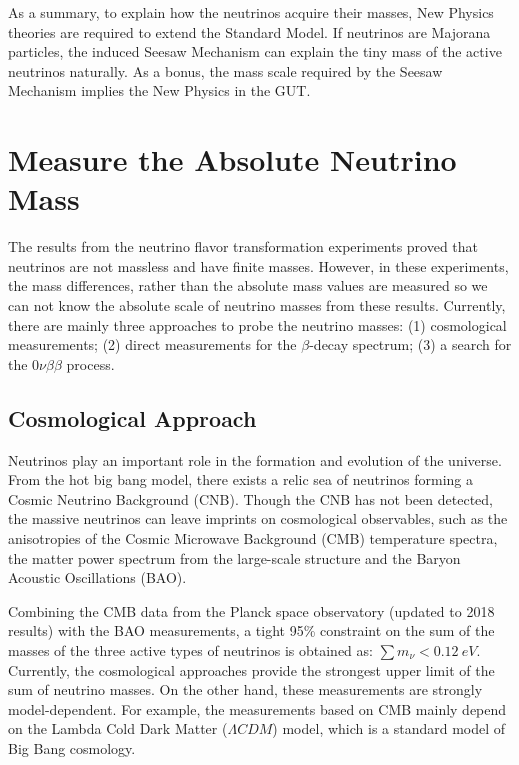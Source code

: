 As a summary, to explain how the neutrinos acquire their masses, New Physics theories are required to extend the Standard Model. If neutrinos are Majorana particles, the induced Seesaw Mechanism can explain the tiny mass of the active neutrinos naturally. As a bonus, the mass scale required by the Seesaw Mechanism implies the New Physics in the GUT.

\section{Measure the Absolute Neutrino Mass}

The results from the neutrino flavor transformation experiments proved that neutrinos are not massless and have finite masses. However, in these experiments, the mass differences, rather than the absolute mass values are measured so we can not know the absolute scale of neutrino masses from these results. Currently, there are mainly three approaches to probe the neutrino masses: (1) cosmological measurements; (2) direct measurements for the $\beta$-decay spectrum; (3) a search for the $0\nu\beta\beta$ process\cite{valle2015neutrinos}. 

\subsection{Cosmological Approach}
Neutrinos play an important role in the formation and evolution of the universe. From the hot big bang model, there exists a relic sea of neutrinos forming a Cosmic Neutrino Background (CNB)\cite{lesgourgues2013neutrino}. Though the CNB has not been detected, the massive neutrinos can leave imprints on cosmological observables, such as the anisotropies of the Cosmic Microwave Background (CMB) temperature spectra, the matter power spectrum from the large-scale structure and the Baryon Acoustic Oscillations (BAO)\cite{dvorkin2019neutrino,gerbino2018status}.

Combining the CMB data from the Planck space observatory (updated to 2018 results) with the BAO measurements, a tight 95\% constraint on the sum of the masses of the three active types of neutrinos is obtained as: $\sum m_\nu<0.12~eV$\cite{aghanim2020planck}. Currently, the cosmological approaches provide the strongest upper limit of the sum of neutrino masses\cite{dvorkin2019neutrino}. On the other hand, these measurements are strongly model-dependent. For example, the measurements based on CMB mainly depend on the Lambda Cold Dark Matter ($\Lambda CDM$) model, which is a standard model of Big Bang cosmology.



